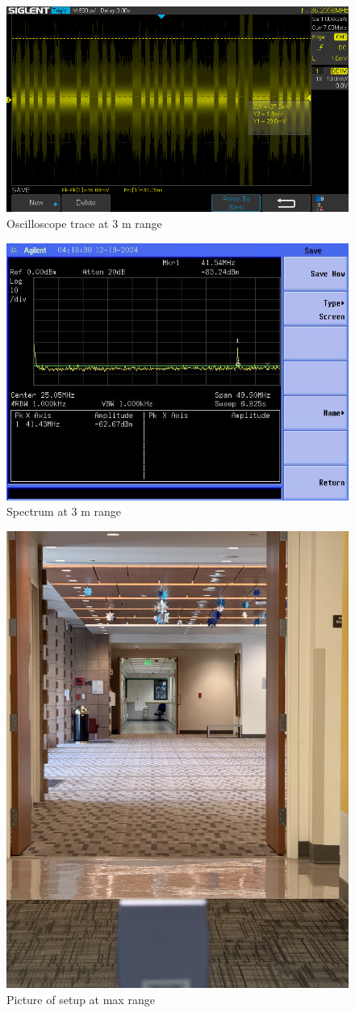 \documentclass[letterpaper,12pt]{article}
\begin{document}
\begin{figure}[H]
	\begin{centering}
		\includegraphics[width=0.5\columnwidth]{figures/3m.trace}
		\caption{Oscilloscope trace at 3 m range}
	\end{centering}
\end{figure}

\begin{figure}[H]
	\begin{centering}
		\includegraphics[width=0.5\columnwidth]{figures/3m.spectra}
		\caption{Spectrum at 3 m range}
	\end{centering}
\end{figure}

\begin{figure}[H]
	\begin{centering}
		\includegraphics[width=0.5\columnwidth]{figures/maxm.img}
		\caption{Picture of setup at max range}
	\end{centering}
\end{figure}
\end{document}
